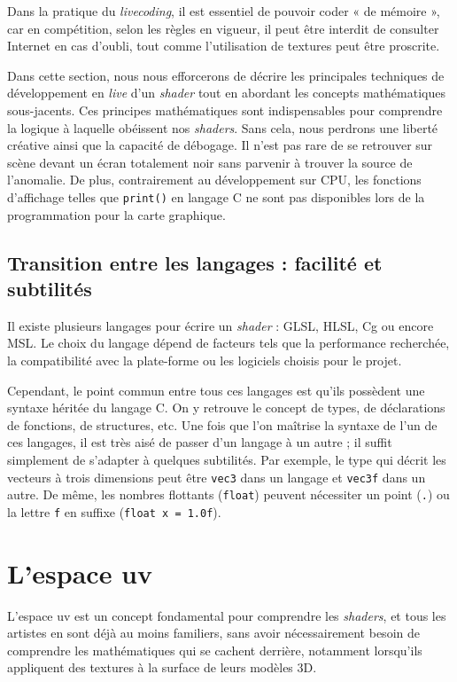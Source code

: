 Dans la pratique du \textit{livecoding}, il est essentiel de pouvoir coder « de mémoire », car en compétition, selon les règles en vigueur, il peut être interdit de consulter Internet en cas d'oubli, tout comme l'utilisation de textures peut être proscrite.

Dans cette section, nous nous efforcerons de décrire les principales techniques de développement en \textit{live} d'un \textit{shader} tout en abordant les concepts mathématiques sous-jacents. Ces principes mathématiques sont indispensables pour comprendre la logique à laquelle obéissent nos \textit{shaders}. Sans cela, nous perdrons une liberté créative ainsi que la capacité de débogage. Il n'est pas rare de se retrouver sur scène devant un écran totalement noir sans parvenir à trouver la source de l'anomalie. De plus, contrairement au développement sur CPU, les fonctions d'affichage telles que \lstinline{print()} en langage C ne sont pas disponibles lors de la programmation pour la carte graphique.

\subsection*{Transition entre les langages : facilité et subtilités}

Il existe plusieurs langages pour écrire un \textit{shader} : GLSL, HLSL, Cg ou encore MSL. Le choix du langage dépend de facteurs tels que la performance recherchée, la compatibilité avec la plate-forme ou les logiciels choisis pour le projet.



Cependant, le point commun entre tous ces langages est qu'ils possèdent une syntaxe héritée du langage C. On y retrouve le concept de types, de déclarations de fonctions, de structures, etc. Une fois que l'on maîtrise la syntaxe de l'un de ces langages, il est très aisé de passer d'un langage à un autre ; il suffit simplement de s'adapter à quelques subtilités. Par exemple, le type qui décrit les vecteurs à trois dimensions peut être \lstinline{vec3} dans un langage et \lstinline{vec3f} dans un autre. De même, les nombres flottants (\lstinline{float}) peuvent nécessiter un point (\lstinline{.}) ou la lettre \lstinline{f} en suffixe (\lstinline{float x = 1.0f}).

\newpage
\section{L'espace uv}

L'espace uv est un concept fondamental pour comprendre les \textit{shaders}, et tous les artistes en sont déjà au moins familiers, sans avoir nécessairement besoin de comprendre les mathématiques qui se cachent derrière, notamment lorsqu'ils appliquent des textures à la surface de leurs modèles 3D.

